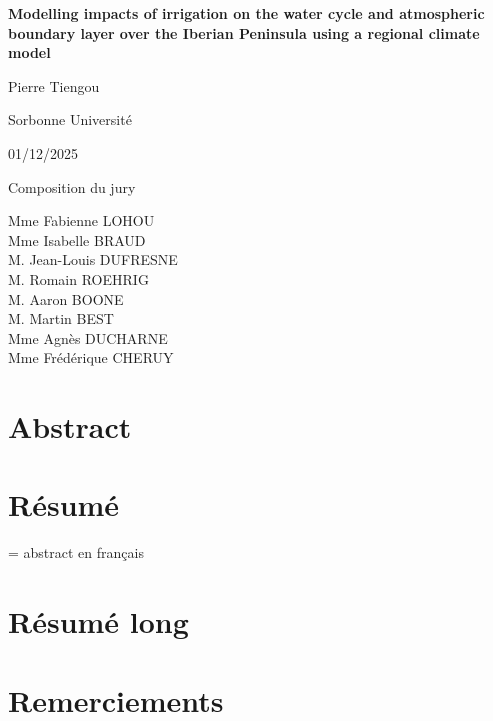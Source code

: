 \documentclass{report}
\begin{document}
\begin{titlepage}
    \centering
    \vspace*{2cm}

    {\Huge\bfseries Modelling impacts of irrigation on the water cycle and atmospheric boundary layer over the Iberian Peninsula using a regional climate model\par}
    \vspace{1cm}

    {\Large Pierre Tiengou\par}
    \vspace{0.5cm}

    {\large Sorbonne Université\par}
    \vspace{0.5cm}

    {\large 01/12/2025\par}

    \vfill
    
    {\large Composition du jury \par
        Mme Fabienne LOHOU \\
        Mme Isabelle BRAUD \\
        M. Jean-Louis DUFRESNE \\
        M. Romain ROEHRIG \\
        M. Aaron BOONE \\
        M. Martin BEST \\
        Mme Agnès DUCHARNE \\
        Mme Frédérique CHERUY\\
    }


\end{titlepage}

\section*{Abstract}
\section*{Résumé}
= abstract en français
\section*{Résumé long}
\section*{Remerciements}
\end{document}
